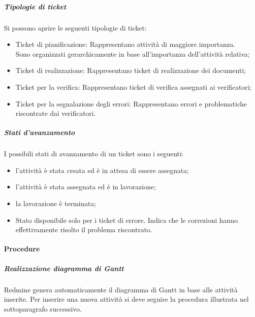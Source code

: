 \subparagraph{Tipologie di ticket}

Si possono aprire le seguenti tipologie di ticket:
\begin{itemize}
\item Ticket di pianificazione: Rappresentano attività di maggiore importanza. Sono organizzati gerarchicamente in base all'importanza dell'attività relativa;
\item Ticket di realizzazione: Rappresentano ticket di realizzazione dei documenti;
\item Ticket per la verifica: Rappresentano ticket di verifica assegnati ai verificatori;
\item Ticket per la segnalazione degli errori: Rappresentano errori e problematiche riscontrate dai verificatori.

\end{itemize}

\subparagraph{Stati d'avanzamento}


I possibili stati di avanzamento di un ticket sono i seguenti:
\begin{itemize}
\item {} l'attività è stata creata ed è in attesa di essere assegnata;
\item {} l'attività è stata assegnata ed è in lavorazione;
\item {} la lavorazione è terminata;
\item {} Stato disponibile solo per i ticket di errore. Indica che le correzioni hanno effettivamente risolto il problema riscontrato.

\end{itemize}


\paragraph{Procedure}
\label{2}
\subparagraph{Realizzazione diagramma di Gantt}
\label{1}
Redmine genera automaticamente il diagramma di Gantt in base alle attività inserite.
Per inserire una nuova attività si deve seguire la procedura illustrata nel sottoparagrafo successivo.

